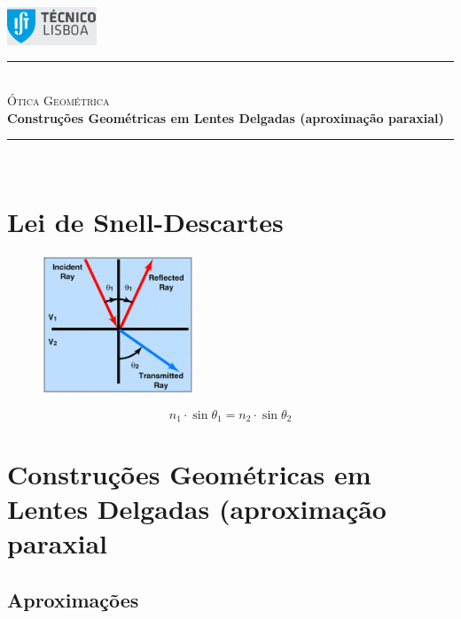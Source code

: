 \documentclass[a4paper,12pt]{article}      %
\author{Prof. Bernardo B. Carvalho}
\date{ Outubro 2012}
\newcommand{\HRule}{\rule{\linewidth}{0.5mm}}
\begin{document}
 

	\includegraphics[width=0.2\textwidth]{../logo-ist}%

	\HRule \\[0.5cm]
	{ \huge \sf  \textsc{Ótica Geométrica}} \\[0.4cm] %
	{ \large \bfseries Construções Geométricas em Lentes Delgadas (aproximação paraxial)}\\
	\HRule \\%

\section{\sf Lei de Snell-Descartes}

\begin{figure}
	[!hb]  \centering 
	\includegraphics[width=0.4\textwidth]{snell}
\end{figure}

 \begin{equation}
	\label{eq:snell}
	n_1 \cdot \sin \theta_1 = n_2 \cdot \sin \theta_2
\end{equation}

\section{\sf Construções Geométricas em Lentes Delgadas (aproximação paraxial}

\subsection{\sf Aproximações}
\end{document}
